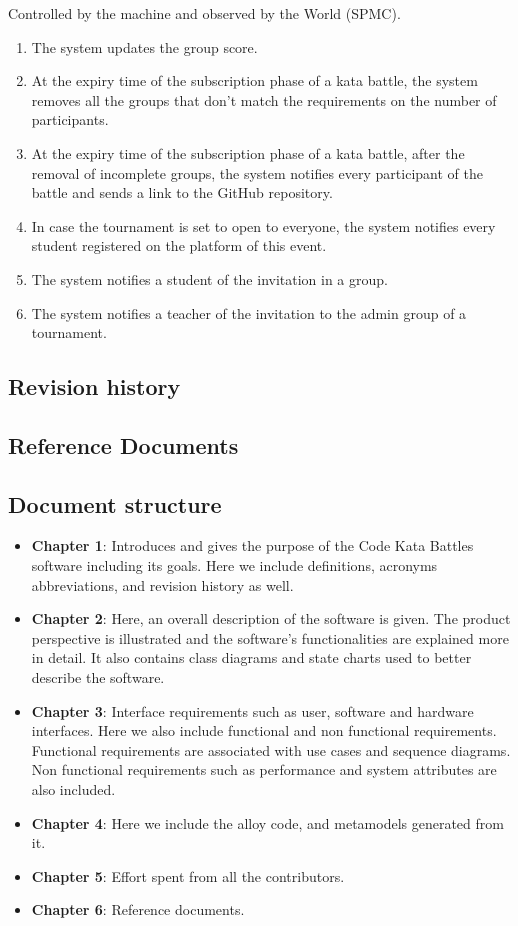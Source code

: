 \documentclass{article}
\begin{document}
        Controlled by the machine and observed by the World (SPMC).

        \begin{enumerate}[label=\textbf{SPMC\arabic*}:, left=0pt]
            \item The system updates the group score.
            \item At the expiry time of the subscription phase of a kata battle, the system removes all the groups that don't match the requirements on the number of participants.
            \item At the expiry time of the subscription phase of a kata battle, after the removal of incomplete groups, the system notifies every participant of the battle and sends a link to the GitHub repository.
            \item In case the tournament is set to open to everyone, the system notifies every student registered on the platform of this event.
            \item The system notifies a student of the invitation in a group.
            \item The system notifies a teacher of the invitation to the admin group of a tournament.
        \end{enumerate}

    
    \subsection{Revision history}
    \subsection{Reference Documents}
    \subsection{Document structure}
    \begin{itemize}
        \item \textbf{Chapter 1}: Introduces and gives the purpose of the Code Kata Battles software including its goals. Here we include definitions, acronyms abbreviations, and revision history as well.
        \item \textbf{Chapter 2}: Here, an overall description of the software is given. The product perspective is illustrated and the software’s functionalities are explained more in detail. It also contains class diagrams and state charts used to better describe the software.
        \item \textbf{Chapter 3}: Interface requirements such as user, software and hardware interfaces. Here we also include functional and non functional requirements. Functional requirements are associated with use cases and sequence diagrams. Non functional requirements such as performance and system attributes are also included.
        \item \textbf{Chapter 4}: Here we include the alloy code, and metamodels generated from it. 
        \item \textbf{Chapter 5}: Effort spent from all the contributors.
        \item \textbf{Chapter 6}: Reference documents.
    \end{itemize}
\end{document}

